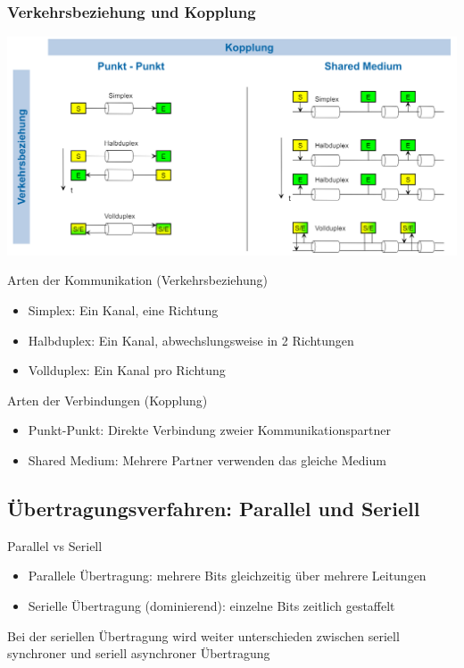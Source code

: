 \subsubsection{Verkehrsbeziehung und Kopplung}
\includegraphics[width=1\linewidth]{images/Verkehrsbeziehung_Kopplung.png}
\begin{concept}{Arten der Kommunikation (Verkehrsbeziehung)}
    \begin{itemize}
        \item Simplex: Ein Kanal, eine Richtung
        \item Halbduplex: Ein Kanal, abwechslungsweise in 2 Richtungen
        \item Vollduplex: Ein Kanal pro Richtung
    \end{itemize}
\end{concept}

\begin{concept}{Arten der Verbindungen (Kopplung)}
    \begin{itemize}
        \item Punkt-Punkt: Direkte Verbindung zweier Kommunikationspartner
        \item Shared Medium: Mehrere Partner verwenden das gleiche Medium
    \end{itemize}
\end{concept}

\columnbreak

\subsection{Übertragungsverfahren: Parallel und Seriell}

\begin{definition}{Parallel vs Seriell}
    \begin{itemize}
        \item Parallele Übertragung: mehrere Bits gleichzeitig über mehrere Leitungen
        \item Serielle Übertragung (dominierend): einzelne Bits zeitlich gestaffelt
    \end{itemize}
    Bei der seriellen Übertragung wird weiter unterschieden zwischen seriell synchroner und
    seriell asynchroner Übertragung
\end{definition}

